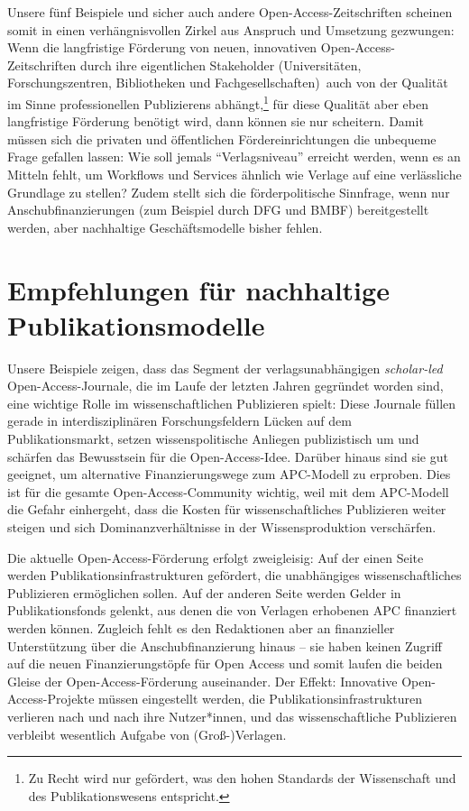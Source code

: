 \documentclass[a4paper,
fontsize=11pt,
oneside,
numbers=noperiodatend,
parskip=half-,
bibliography=totoc,
final
]{scrartcl}
\begin{document}
Unsere fünf Beispiele und sicher auch andere Open-Access-Zeitschriften
scheinen somit in einen verhängnisvollen Zirkel aus Anspruch und
Umsetzung gezwungen: Wenn die langfristige Förderung von neuen,
innovativen Open-Access-Zeitschriften durch ihre eigentlichen
Stakeholder (Universitäten, Forschungszentren, Bibliotheken und
Fachgesellschaften)~auch von der Qualität im Sinne professionellen
Publizierens abhängt,\footnote{Zu Recht wird nur gefördert, was den
  hohen Standards der Wissenschaft und des Publikationswesens
  entspricht.} für diese Qualität aber eben langfristige Förderung
benötigt wird, dann können sie nur scheitern. Damit müssen sich die
privaten und öffentlichen Fördereinrichtungen die unbequeme Frage
gefallen lassen: Wie soll jemals \enquote{Verlagsniveau} erreicht
werden, wenn es an Mitteln fehlt, um Workflows und Services ähnlich wie
Verlage auf eine verlässliche Grundlage zu stellen? Zudem stellt sich
die förderpolitische Sinnfrage, wenn nur Anschubfinanzierungen (zum
Beispiel durch DFG und BMBF) bereitgestellt werden, aber nachhaltige
Geschäftsmodelle bisher fehlen.

\hypertarget{empfehlungen-fuxfcr-nachhaltige-publikationsmodelle}{%
\section{Empfehlungen für nachhaltige
Publikationsmodelle}\label{empfehlungen-fuxfcr-nachhaltige-publikationsmodelle}}

Unsere Beispiele zeigen, dass das Segment der verlagsunabhängigen
\emph{scholar-led} Open-Access-Journale, die im Laufe der letzten Jahren
gegründet worden sind, eine wichtige Rolle im wissenschaftlichen
Publizieren spielt: Diese Journale füllen gerade in interdisziplinären
Forschungsfeldern Lücken auf dem Publikationsmarkt, setzen
wissenspolitische Anliegen publizistisch um und schärfen das Bewusstsein
für die Open-Access-Idee. Darüber hinaus sind sie gut geeignet, um
alternative Finanzierungswege zum APC-Modell zu erproben. Dies ist für
die gesamte Open-Access-Community wichtig, weil mit dem APC-Modell die
Gefahr einhergeht, dass die Kosten für wissenschaftliches Publizieren
weiter steigen und sich Dominanzverhältnisse in der Wissensproduktion
verschärfen.

Die aktuelle Open-Access-Förderung erfolgt zweigleisig: Auf der einen
Seite werden Publikationsinfrastrukturen gefördert, die unabhängiges
wissenschaftliches Publizieren ermöglichen sollen. Auf der anderen Seite
werden Gelder in Publikationsfonds gelenkt, aus denen die von Verlagen
erhobenen APC finanziert werden können. Zugleich fehlt es den
Redaktionen aber an finanzieller Unterstützung über die
Anschubfinanzierung hinaus -- sie haben keinen Zugriff auf die neuen
Finanzierungstöpfe für Open Access und somit laufen die beiden Gleise
der Open-Access-Förderung auseinander. Der Effekt: Innovative
Open-Access-Projekte müssen eingestellt werden, die
Publikationsinfrastrukturen verlieren nach und nach ihre Nutzer*innen,
und das wissenschaftliche Publizieren verbleibt wesentlich Aufgabe von
(Groß-)Verlagen.
\end{document}
